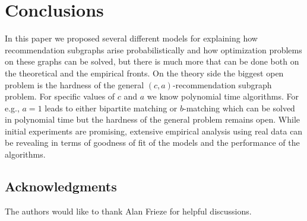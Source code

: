 \section{Conclusions}

In this paper we proposed several different models for explaining how
recommendation subgraphs arise probabilistically and how optimization
problems on these graphs can be solved, but there is much more that
can be done both on the theoretical and the empirical fronts. On the
theory side the biggest open problem is the hardness of the general
$(c, a)$-recommendation subgraph problem. For specific values of $c$
and $a$ we know polynomial time algorithms. For e.g., $a=1$ leads to
either bipartite matching or $b$-matching which can be solved in
polynomial time but the hardness of the general problem remains
open. While initial experiments are promising, extensive empirical
analysis using real data can be revealing in terms of goodness of fit
of the models and the performance of the algorithms.

\subsection*{Acknowledgments}
The authors would like to thank Alan Frieze for helpful discussions.





